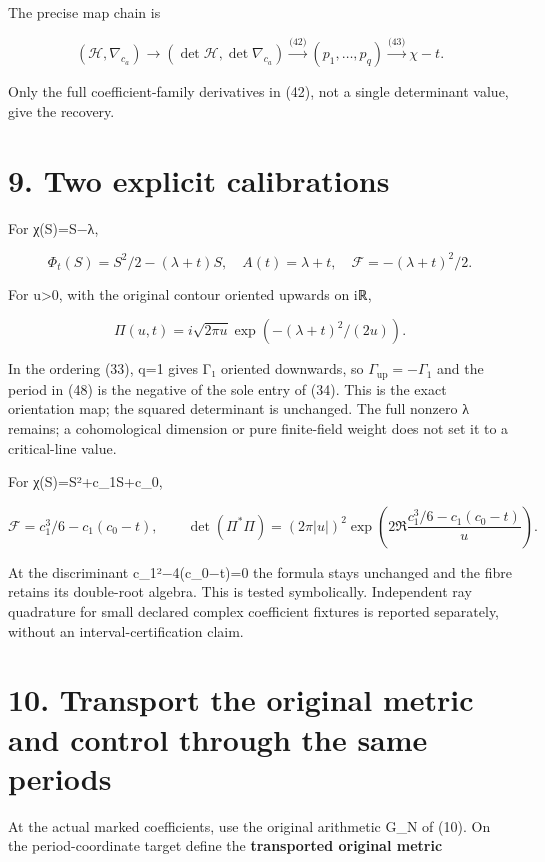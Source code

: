 \documentclass[
  11pt,
]{article}
\begin{document}
The precise map chain is

\[
(\mathcal H,\nabla_{c_a})\longrightarrow
(\det\mathcal H,\det\nabla_{c_a})
\xrightarrow{\text{(42)}}(p_1,\ldots,p_q)
\xrightarrow{\text{(43)}}\chi-t.
\tag{46}
\]

Only the full coefficient-family derivatives in (42), not a single
determinant value, give the recovery.

\section{9. Two explicit calibrations}\label{two-explicit-calibrations}

For χ(S)=S−λ,

\[
\Phi_t(S)=S^2/2-(\lambda+t)S,
\quad A(t)=\lambda+t,
\quad\mathcal F=-(\lambda+t)^2/2.
\tag{47}
\]

For u\textgreater0, with the original contour oriented upwards on iℝ,

\[
\Pi(u,t)=i\sqrt{2\pi u}\exp(-(\lambda+t)^2/(2u)).
\tag{48}
\]

In the ordering (33), q=1 gives Γ₁ oriented downwards, so
\(\Gamma_{\mathrm{up}}=-\Gamma_1\) and the period in (48) is the
negative of the sole entry of (34). This is the exact orientation map;
the squared determinant is unchanged. The full nonzero λ remains; a
cohomological dimension or pure finite-field weight does not set it to a
critical-line value.

For χ(S)=S²+c\_1S+c\_0,

\[
\mathcal F=c_1^3/6-c_1(c_0-t),
\qquad
\det(\Pi^*\Pi)
 =(2\pi|u|)^2
 \exp\!\left(2\Re\frac{c_1^3/6-c_1(c_0-t)}u\right).
\tag{49}
\]

At the discriminant c\_1²−4(c\_0−t)=0 the formula stays unchanged and
the fibre retains its double-root algebra. This is tested symbolically.
Independent ray quadrature for small declared complex coefficient
fixtures is reported separately, without an interval-certification
claim.

\section{10. Transport the original metric and control through the same
periods}\label{transport-the-original-metric-and-control-through-the-same-periods}

At the actual marked coefficients, use the original arithmetic G\_N of
(10). On the period-coordinate target define the \textbf{transported
original metric}
\end{document}
